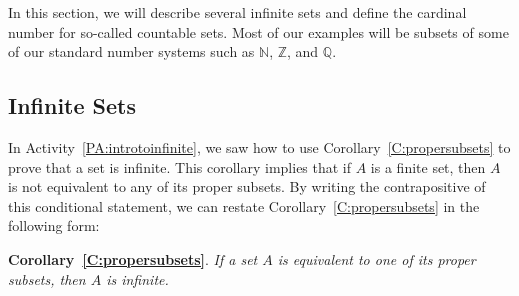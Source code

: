 In this section, we will describe several infinite sets and define the cardinal number for so-called countable sets.  Most of our examples will be subsets of some of our standard number systems such as $\mathbb{N}$, $\mathbb{Z}$, and $\mathbb{Q}$.  


\subsection*{Infinite Sets}
In \typeu Activity~\ref*{PA:introtoinfinite}, we saw how to use Corollary~\ref{C:propersubsets} to prove that a set is infinite.  This corollary implies that if $A$ is a finite set, then $A$ is not equivalent to any of its proper subsets.  By writing the contrapositive of this conditional statement, we can restate Corollary~\ref{C:propersubsets} in the following form:

\vskip9pt
\noindent
\textbf{Corollary~\ref{C:propersubsets}}.
\emph{If a set $A$ is equivalent to one of its proper subsets, then $A$ is infinite.}


